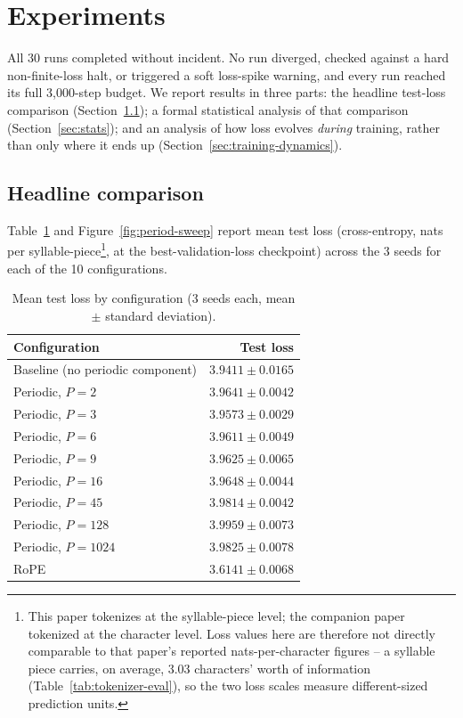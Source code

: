 \documentclass[11pt]{article}
\begin{document}
\section{Experiments}
\label{sec:experiments}

All 30 runs completed without incident. No run diverged, checked against a hard non-finite-loss halt, or triggered a soft loss-spike warning, and every run reached its full 3{,}000-step budget. We report results in three parts: the headline test-loss comparison (Section~\ref{sec:headline}); a formal statistical analysis of that comparison (Section~\ref{sec:stats}); and an analysis of how loss evolves \emph{during} training, rather than only where it ends up (Section~\ref{sec:training-dynamics}).

\subsection{Headline comparison}
\label{sec:headline}

Table~\ref{tab:headline} and Figure~\ref{fig:period-sweep} report mean test loss (cross-entropy, nats per syllable-piece\footnote{This paper tokenizes at the syllable-piece level; the companion paper tokenized at the character level. Loss values here are therefore not directly comparable to that paper's reported nats-per-character figures -- a syllable piece carries, on average, 3.03 characters' worth of information (Table~\ref{tab:tokenizer-eval}), so the two loss scales measure different-sized prediction units.}, at the best-validation-loss checkpoint) across the 3 seeds for each of the 10 configurations.

\begin{table}[h]
\centering
\caption{Mean test loss by configuration (3 seeds each, mean $\pm$ standard deviation).}
\label{tab:headline}
\begin{tabular}{lr}
\toprule
Configuration & Test loss \\
\midrule
Baseline (no periodic component) & $3.9411 \pm 0.0165$ \\
Periodic, $P=2$ & $3.9641 \pm 0.0042$ \\
Periodic, $P=3$ & $3.9573 \pm 0.0029$ \\
Periodic, $P=6$ & $3.9611 \pm 0.0049$ \\
Periodic, $P=9$ & $3.9625 \pm 0.0065$ \\
Periodic, $P=16$ & $3.9648 \pm 0.0044$ \\
Periodic, $P=45$ & $3.9814 \pm 0.0042$ \\
Periodic, $P=128$ & $3.9959 \pm 0.0073$ \\
Periodic, $P=1024$ & $3.9825 \pm 0.0078$ \\
RoPE & $3.6141 \pm 0.0068$ \\
\bottomrule
\end{tabular}
\end{table}
\end{document}
